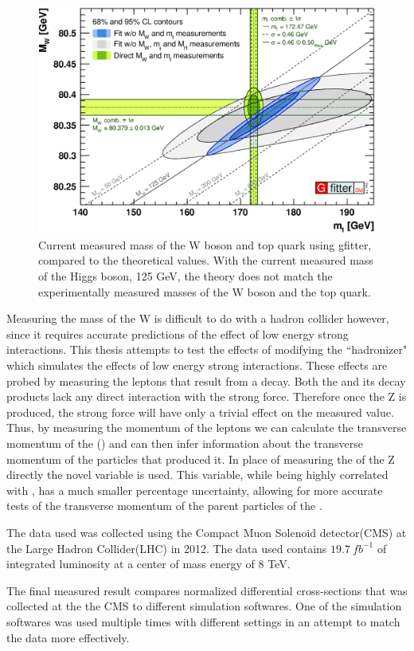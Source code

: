 \begin{figure}[!htbp]
    \centering
    \includegraphics[width=\textwidth]{figures/TheoryFigures/2018_03_20_Scan2D_MWvsmt_logo.eps}
    \caption[
        W mass gFitter results
    ]{
     Current measured mass of the W boson and top quark using gfitter, compared to the theoretical values. With the current measured mass of the Higgs boson, 125 GeV, the theory does not match the experimentally measured masses of the W boson and the top quark. 
    }
    \label{fig:gfitterResults}
\end{figure} Measuring the mass of the W is difficult to do with a hadron collider however, since it requires accurate predictions of the effect of low energy strong interactions.  This thesis attempts to test the effects of modifying the ``hadronizer" which simulates the effects of low energy strong interactions. These effects are probed by measuring the leptons that result from a \Z decay. Both the \Z and its decay products lack any direct interaction with the strong force.  Therefore once the Z is produced, the strong force will have only a trivial effect on the measured value. Thus, by measuring the momentum of the leptons we can calculate the transverse momentum of the \Z(\bosonpt) and can then infer information about the transverse momentum of the particles that produced it. In place of measuring the \bosonpt of the Z directly the novel variable \phistar is used\cite{PhiStarSource}. This variable, while being highly correlated with \bosonpt, has a much smaller percentage uncertainty, allowing for more accurate tests of the transverse momentum  of the parent particles of the \Z.  

The data used was collected using the Compact Muon Solenoid detector(CMS) at the Large Hadron Collider(LHC) in 2012. The data used  contains $\SI{19.7}{fb}^{-1}$ of integrated luminosity at a center of mass energy of 8 TeV. 

The final measured result compares normalized \phistar differential cross-sections that was collected at the the CMS to different simulation softwares. One of the simulation softwares was used multiple times with different settings in an attempt to match the data more effectively.




